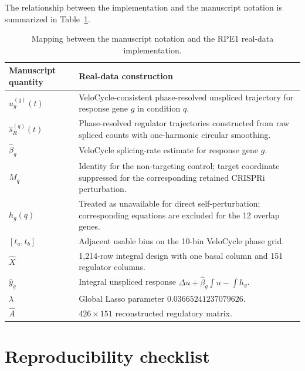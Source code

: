 \documentclass[supplement,onefignum,onetabnum]{siamart251216}
\begin{document}
The relationship between the implementation and the manuscript notation is summarized in Table~\ref{tab:rpe1-notation-map}.

\begin{table}[htbp]
\footnotesize
\caption{Mapping between the manuscript notation and the RPE1 real-data implementation.}
\label{tab:rpe1-notation-map}
\begin{center}
\begin{tabular}{p{}p{}}
\toprule
Manuscript quantity & Real-data construction \\
\midrule
\(\widehat u_g^{(q)}(t)\) & VeloCycle-consistent phase-resolved unspliced trajectory for response gene \(g\) in condition \(q\). \\
\(\widehat s_R^{(q)}(t)\) & Phase-resolved regulator trajectories constructed from raw spliced counts with one-harmonic circular smoothing. \\
\(\widehat\beta_g\) & VeloCycle splicing-rate estimate for response gene \(g\). \\
\(M_q\) & Identity for the non-targeting control; target coordinate suppressed for the corresponding retained CRISPRi perturbation. \\
\(h_g(q)\) & Treated as unavailable for direct self-perturbation; corresponding equations are excluded for the 12 overlap genes. \\
\([t_a,t_b]\) & Adjacent usable bins on the 10-bin VeloCycle phase grid. \\
\(\widehat X\) & 1,214-row integral design with one basal column and 151 regulator columns. \\
\(\widehat y_g\) & Integral unspliced response \(\Delta u+\widehat\beta_g\int u-\int h_g\). \\
\(\lambda\) & Global Lasso parameter \(0.03665241237079626\). \\
\(\widehat A\) & \(426\times151\) reconstructed regulatory matrix. \\
\bottomrule
\end{tabular}
\end{center}
\end{table}

\section{Reproducibility checklist}
\end{document}
